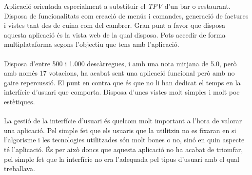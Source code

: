 Aplicació\cite{ordersev} orientada especialment a substituir el \textit{TPV} d'un bar o restaurant. Disposa de funcionalitats com creació de menús i comandes, generació de factures i vistes tant des de cuina com del cambrer. Gran punt a favor que disposa aquesta aplicació és la vista web de la qual disposa. Pots accedir de forma multiplataforma segons l'objectiu que tens amb l'aplicació.
\\\\
Disposa d'entre 500 i 1.000 descàrregues, i amb una nota mitjana de 5.0, però amb només 17 votacions, ha acabat sent una aplicació funcional però amb no gaire repercussió. El punt en contra que és que no li han dedicat el temps en la interfície d'usuari que comporta. Disposa d'unes vistes molt simples i molt poc estètiques.
\\\\
La gestió de la interfície d'usuari és quelcom molt important a l'hora de valorar una aplicació. Pel simple fet que els usuaris que la utilitzin no es fixaran en si l'algorisme i les tecnologies utilitzades són molt bones o no, sinó en quin aspecte té l'aplicació. És per això doncs que aquesta aplicació no ha acabat de triomfar, pel simple fet que la interfície no era l'adequada pel tipus d'usuari amb el qual treballava.
\\
